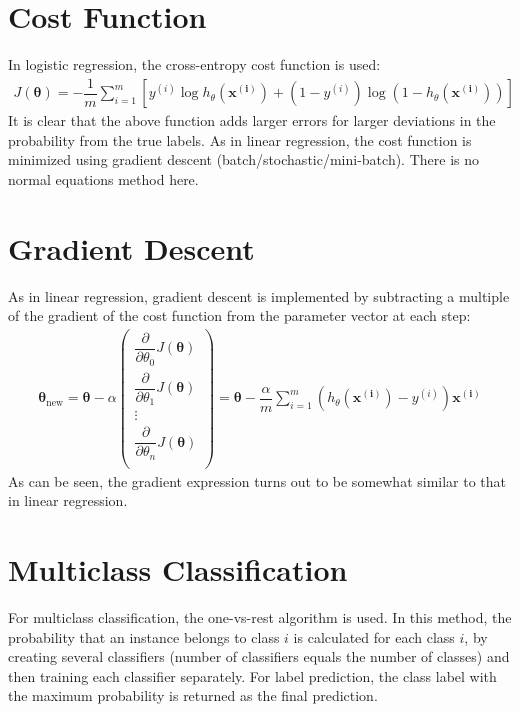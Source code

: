 \documentclass[a4paper, 12pt]{report}
\begin{document}
\section{Cost Function}
In logistic regression, the cross-entropy cost function is used:
\begin{align*}
J\left(\bm{\theta}\right) = -\dfrac{1}{m}\sum_{i=1}^{m}\left[y^{\left(i\right)}\log h_{\theta}\left(\bm{x^{\left(i\right)}}\right) + \left(1 - y^{\left(i\right)}\right)\log \left(1 - h_{\theta}\left(\bm{x^{\left(i\right)}}\right)\right)\right]
\end{align*}
It is clear that the above function adds larger errors for larger deviations in the probability from the true labels. As in linear regression, the cost function is minimized using gradient descent (batch/stochastic/mini-batch). There is no normal equations method here.

\section{Gradient Descent}
As in linear regression, gradient descent is implemented by subtracting a multiple of the gradient of the cost function from the parameter vector at each step:
\begin{align*}
\bm{\theta}_{\text{new}} = \bm{\theta} - \alpha
\begin{pmatrix}
\dfrac{\partial}{\partial \theta_0}J\left(\bm{\theta}\right) \\
\dfrac{\partial}{\partial \theta_1}J\left(\bm{\theta}\right) \\
\vdots \\
\dfrac{\partial}{\partial \theta_n}J\left(\bm{\theta}\right) \\
\end{pmatrix}
= \bm{\theta} - \dfrac{\alpha}{m}\sum_{i=1}^{m}\left(h_{\theta}\left(\bm{x^{\left(i\right)}}\right)-y^{\left(i\right)}\right)\bm{x^{\left(i\right)}}
\end{align*}
As can be seen, the gradient expression turns out to be somewhat similar to that in linear regression.

\section{Multiclass Classification}
For multiclass classification, the one-vs-rest algorithm is used. In this method, the probability that an instance belongs to class $i$ is calculated for each class $i$, by creating several classifiers (number of classifiers equals the number of classes) and then training each classifier separately. For label prediction, the class label with the maximum probability is returned as the final prediction.
\end{document}
